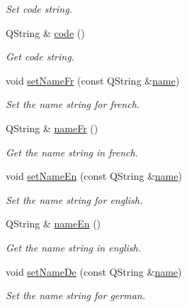 \begin{DoxyCompactItemize}
\begin{DoxyCompactList}\small\item\em Set code string. \end{DoxyCompactList}\item 
Q\-String \& \hyperlink{classmdt_uic_number_item_a43652b0e8b1685b5d9890d175b42dc75}{code} ()
\begin{DoxyCompactList}\small\item\em Get code string. \end{DoxyCompactList}\item 
void \hyperlink{classmdt_uic_number_item_a048e9a4070062e6d68dde4f264fdac05}{set\-Name\-Fr} (const Q\-String \&\hyperlink{classmdt_uic_number_item_a6e2bfad78dc1761b35ed6a642a345bb9}{name})
\begin{DoxyCompactList}\small\item\em Set the name string for french. \end{DoxyCompactList}\item 
Q\-String \& \hyperlink{classmdt_uic_number_item_a088b41783b5f1bee0e49be43b993269c}{name\-Fr} ()
\begin{DoxyCompactList}\small\item\em Get the name string in french. \end{DoxyCompactList}\item 
void \hyperlink{classmdt_uic_number_item_a63e2c89465b2053081ae89b2de9de1f3}{set\-Name\-En} (const Q\-String \&\hyperlink{classmdt_uic_number_item_a6e2bfad78dc1761b35ed6a642a345bb9}{name})
\begin{DoxyCompactList}\small\item\em Set the name string for english. \end{DoxyCompactList}\item 
Q\-String \& \hyperlink{classmdt_uic_number_item_a5f87c87141076cf481173d7f75984ef1}{name\-En} ()
\begin{DoxyCompactList}\small\item\em Get the name string in english. \end{DoxyCompactList}\item 
void \hyperlink{classmdt_uic_number_item_a28a50d800a2de3f7e24f549ea14f9446}{set\-Name\-De} (const Q\-String \&\hyperlink{classmdt_uic_number_item_a6e2bfad78dc1761b35ed6a642a345bb9}{name})
\begin{DoxyCompactList}\small\item\em Set the name string for german. \end{DoxyCompactList}\item 

\end{DoxyCompactItemize}
